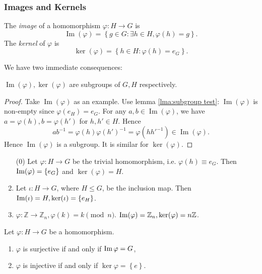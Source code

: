 \documentclass[a4paper]{article}
\begin{document}
    \subsubsection{Images and Kernels}
    \begin{definition}
        The \textit{image} of a homomorphism $ \varphi: H \to G $ is 
        \[
            \operatorname{Im}(\varphi)=\left\{ g\in G: \exists h\in H, \varphi(h)=g \right\}
        .\]
        The \textit{kernel} of $ \varphi $ is 
        \[
            \ker(\varphi)=\left\{ h\in H: \varphi(h)=e_G \right\}
        .\]
    \end{definition}
    We have two immediate consequences:
    \begin{proposition}\label{prop:ker, im are groups}
        $ \operatorname{Im}(\varphi), \ker (\varphi)  $ are subgroups of $G,H$ respectively.
    \end{proposition}
    \begin{proof}
        Take $ \operatorname{Im}(\varphi) $ as an example. Use lemma \ref{lma:subgroup test}: $ \operatorname{Im}(\varphi)  $ is non-empty since $ \varphi(e_H)=e_G $. For any $ a,b\in \operatorname{Im}(\varphi)  $, we have $ a=\varphi(h), b=\varphi(h') $ for $h,h'\in H$. Hence
        \[
            ab^{-1}=\varphi(h)\varphi(h')^{-1}=\varphi(hh'^{-1})\in \operatorname{Im}(\varphi) 
        .\]
        Hence $ \operatorname{Im}(\varphi)  $ is a subgroup. It is similar for $ \ker (\varphi) $.
    \end{proof}
    \begin{example}
        \begin{enumerate}[(1)]
            \item[(0)] Let $ \varphi:H\to G $ be the trivial homomorphism, i.e. $ \varphi(h)\equiv e_G $. Then $ \operatorname{Im}(\varphi)=\left\{ e_G\right\} $ and $ \ker (\varphi)=H $.
            \item Let $ \iota: H\to G $, where $H\le G$, be the inclusion map. Then $ \operatorname{Im} (\iota) = H, \ker (\iota) = \left\{ e_H\right\} $.
            \item $ \varphi: \mathbb{Z} \to \mathbb{Z}_n, \varphi(k)=k \pmod n $. $ \operatorname{Im} (\varphi)=\mathbb{Z}_n, \ker (\varphi)= n \mathbb{Z}$.
        \end{enumerate}
    \end{example}
    \begin{proposition}\label{prop:homom surj}
        Let $ \varphi:H\to G $ be a homomorphism.
        \begin{enumerate}[(1)]
            \item $ \varphi $ is surjective if and only if $ \operatorname{Im} \varphi = G $,
            \item $ \varphi $ is injective if and only if $ \ker \varphi = \left\{ e\right\} $.
        \end{enumerate}
    \end{proposition}
\end{document}
